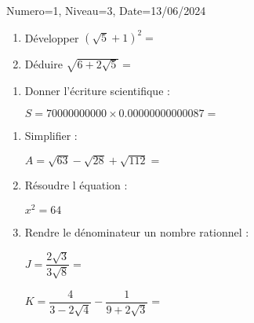 \documentclass[a4paper,12pt]{article}
\begin{document}
\begin{Maquette}[DS]{Numero=1, Niveau=3, Date=13/06/2024}

\begin{exercice}[BaremeDetaille]
\begin{enumerate}
\item{} Développer $(\sqrt{5}+1)^{2}=$\anserline[1]
\item{} Déduire $\sqrt{6+2\sqrt{5}}=$\anserline[1]
\end{enumerate}
\end{exercice}

\begin{exercice}[BaremeDetaille]
\begin{enumerate}
\item{} Donner l'écriture scientifique :

$ S=70000000000 \times 0.00000000000087=$\anserline[6]
\end{enumerate}
\end{exercice}

\begin{exercice}[BaremeDetaille]
\begin{enumerate}
\item{} Simplifier :

$A=\sqrt{63}-\sqrt{28}+\sqrt{112}=$\anserline[3]
\item{} Résoudre l équation :

$x^{2}=64$\anserline[3]

\item{} Rendre le dénominateur un nombre rationnel :

$J=\dfrac{2\sqrt{3}}{3\sqrt{8}}=$\anserline[3]

$K=\dfrac{4}{3-2\sqrt{4}}-\dfrac{1}{9+2\sqrt{3}}=$\anserline[8]
\end{enumerate}
\vspace{1cm}
\end{exercice}

\end{Maquette}
\end{document}
